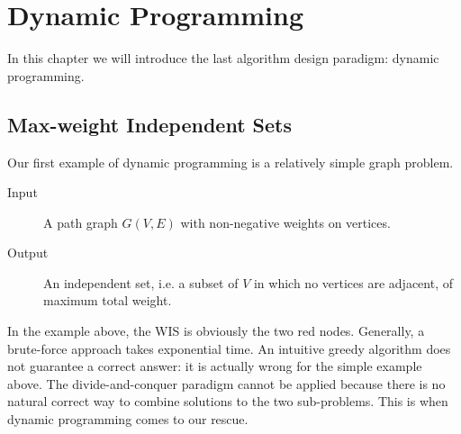 \ifx\PREAMBLE\undefined


\fi
\chapter{Dynamic Programming}
In this chapter we will introduce the last algorithm design paradigm: dynamic programming.
\section{Max-weight Independent Sets}
Our first example of dynamic programming is a relatively simple graph problem.
\begin{description}
\item[Input]A path graph $G(V,E)$ with non-negative weights on vertices.
\item[Output]An independent set, i.e. a subset of $V$ in which no vertices are adjacent, of maximum total weight.
\end{description}
\begin{center}
\end{center}
In the example above, the WIS is obviously the two red nodes. Generally, a brute-force approach takes exponential time. An intuitive greedy algorithm does not guarantee a correct answer: it is actually wrong for the simple example above.  The divide-and-conquer paradigm cannot be applied because there is no natural correct way to combine solutions to the two sub-problems. This is when dynamic programming comes to our rescue.

